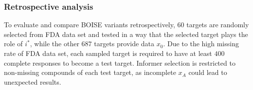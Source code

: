 \documentclass[11pt,a4paper]{article}
\theoremstyle{plain}
\begin{document}

\subsubsection{Retrospective analysis}
To evaluate and compare BOISE variants retrospectively, $60$ targets are randomly selected from FDA data set and tested in a way that the selected target plays the role of $i^*$, while the other $687$ targets provide data $x_0$. 
Due to the high missing rate of FDA data set, each sampled target is required to have at least $400$ complete 
responses to become a test target. 
Informer selection is restricted to non-missing compounds of each test target, as incomplete $x_A$ could lead to unexpected results. 
\end{document}

